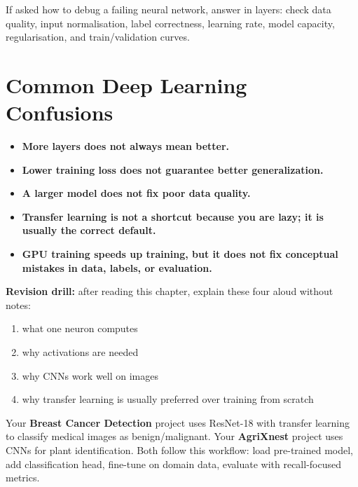 \documentclass[12pt, a4paper, oneside]{book}
\begin{document}
\begin{examtipbox}
If asked how to debug a failing neural network, answer in layers: check data quality, input normalisation, label correctness, learning rate, model capacity, regularisation, and train/validation curves.
\end{examtipbox}

\section{Common Deep Learning Confusions}

\begin{itemize}[leftmargin=2em]
    \item \textbf{More layers does not always mean better.}
    \item \textbf{Lower training loss does not guarantee better generalization.}
    \item \textbf{A larger model does not fix poor data quality.}
    \item \textbf{Transfer learning is not a shortcut because you are lazy; it is usually the correct default.}
    \item \textbf{GPU training speeds up training, but it does not fix conceptual mistakes in data, labels, or evaluation.}
\end{itemize}

\begin{exercisebox}
\textbf{Revision drill:} after reading this chapter, explain these four aloud without notes:
\begin{enumerate}[leftmargin=2em]
    \item what one neuron computes
    \item why activations are needed
    \item why CNNs work well on images
    \item why transfer learning is usually preferred over training from scratch
\end{enumerate}
\end{exercisebox}

\begin{projectbox}
Your \textbf{Breast Cancer Detection} project uses ResNet-18 with transfer learning to classify medical images as benign/malignant. Your \textbf{AgriXnest} project uses CNNs for plant identification. Both follow this workflow: load pre-trained model, add classification head, fine-tune on domain data, evaluate with recall-focused metrics.
\end{projectbox}
\end{document}

